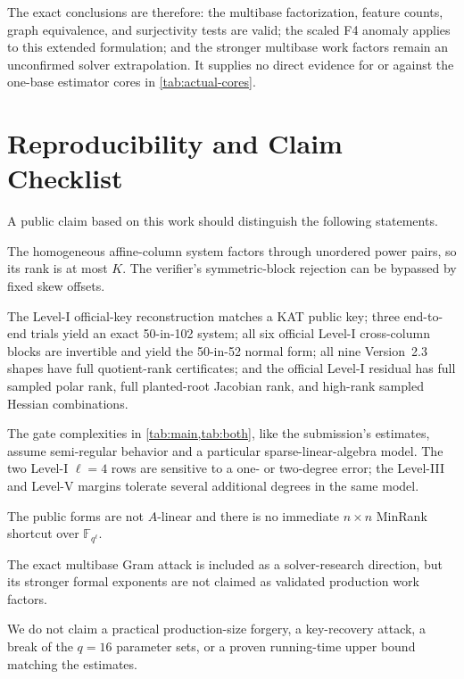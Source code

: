 \documentclass[runningheads]{llncs}
\newcommand{\F}{\mathbb F}
\begin{document}
The exact conclusions are therefore: the multibase factorization, feature counts,
graph equivalence, and surjectivity tests are valid; the scaled F4 anomaly applies
to this extended formulation; and the stronger multibase work factors remain an
unconfirmed solver extrapolation.  It supplies no direct evidence for or against
the one-base estimator cores in \cref{tab:actual-cores}.

\section{Reproducibility and Claim Checklist}\label{app:repro}

A public claim based on this work should distinguish the following statements.

\begin{description}[leftmargin=0pt]
\item[Proved algebraically.] The homogeneous affine-column system factors through unordered power pairs, so its rank is at most $K$.  The verifier's symmetric-block rejection can be bypassed by fixed skew offsets.
\item[Checked computationally.] The Level-I official-key reconstruction matches a KAT public key; three end-to-end trials yield an exact 50-in-102 system; all six official Level-I cross-column blocks are invertible and yield the 50-in-52 normal form; all nine Version~2.3 shapes have full quotient-rank certificates; and the official Level-I residual has full sampled polar rank, full planted-root Jacobian rank, and high-rank sampled Hessian combinations.
\item[Estimated heuristically.] The gate complexities in \cref{tab:main,tab:both}, like the submission's estimates, assume semi-regular behavior and a particular sparse-linear-algebra model.  The two Level-I $\ell=4$ rows are sensitive to a one- or two-degree error; the Level-III and Level-V margins tolerate several additional degrees in the same model.
\item[Audited negative result.] The public forms are not $A$-linear and there is no immediate $n\times n$ MinRank shortcut over $\F_{q^\ell}$.
\item[Preliminary extension.] The exact multibase Gram attack is included as a solver-research direction, but its stronger formal exponents are not claimed as validated production work factors.
\item[Not claimed.] We do not claim a practical production-size forgery, a key-recovery attack, a break of the $q=16$ parameter sets, or a proven running-time upper bound matching the estimates.
\end{description}
\end{document}
